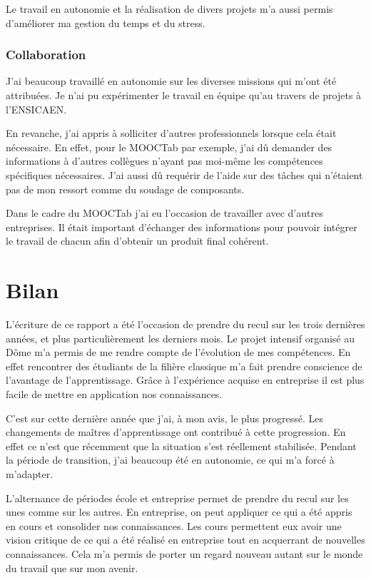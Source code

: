 \documentclass[french,12pt,a4paper,titlepage,openright,openbib]{report}
\begin{document}
Le travail en autonomie et la réalisation de divers projets m'a aussi permis d'améliorer ma gestion du temps et du stress.

\subsection{Collaboration}
J'ai beaucoup travaillé en autonomie sur les diverses missions qui m'ont été attribuées. Je n'ai pu expérimenter le travail en équipe qu'au travers de projets à l'ENSICAEN.

En revanche, j'ai appris à solliciter d'autres professionnels lorsque cela était nécessaire.
En effet, pour le MOOCTab par exemple, j'ai dû demander des informations à d'autres collègues n'ayant pas moi-même les compétences spécifiques nécessaires.
J'ai aussi dû requérir de l'aide sur des tâches qui n'étaient pas de mon ressort comme du soudage de composants.

Dans le cadre du MOOCTab j'ai eu l'occasion de travailler avec d'autres entreprises. Il était important d'échanger des informations pour pouvoir intégrer le travail de chacun afin d'obtenir un produit final cohérent.

\chapter{Bilan}
L'écriture de ce rapport a été l'occasion de prendre du recul sur les trois dernières années, et plus particulièrement les derniers mois.
Le projet intensif organisé au Dôme m'a permis de me rendre compte de l'évolution de mes compétences.
En effet rencontrer des étudiants de la filière classique m'a fait prendre conscience de l'avantage de l'apprentissage. Grâce à l'expérience acquise en entreprise il est plus facile de mettre en application nos connaissances.

C'est sur cette dernière année que j'ai, à mon avis, le plus progressé.
Les changements de maîtres d'apprentissage ont contribué à cette progression. En effet ce n'est que récemment que la situation s'est réellement stabilisée. Pendant la période de transition, j'ai beaucoup été en autonomie, ce qui m'a forcé à m'adapter.

L'alternance de périodes école et entreprise permet de prendre du recul sur les unes comme sur les autres. En entreprise, on peut appliquer ce qui a été appris en cours et consolider nos connaissances. Les cours permettent eux avoir une vision critique de ce qui a été réalisé en entreprise tout en acquerrant de nouvelles connaissances. Cela m'a permis de porter un regard nouveau autant sur le monde du travail que sur mon avenir.
\end{document}
